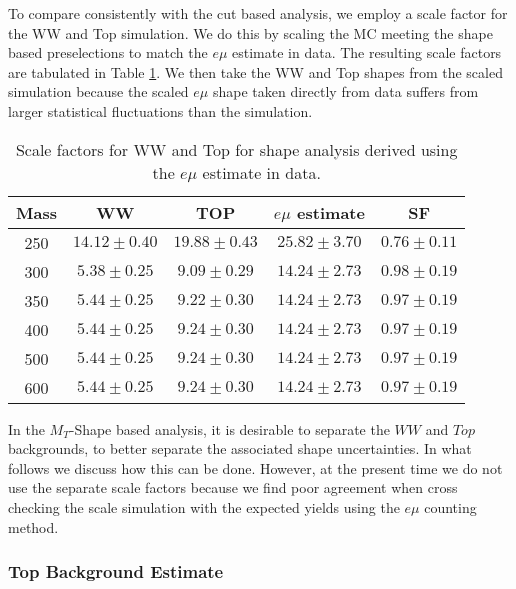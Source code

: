 
To compare consistently with the cut based analysis, we employ a scale factor
for the WW and Top simulation.  We do this by scaling the MC meeting the
shape based preselections to match the $e\mu$ estimate in data.
The resulting scale factors are tabulated in Table \ref{tab:shape_sf_emu}.
We then take the WW and Top shapes from the scaled simulation because the 
scaled $e\mu$ shape taken directly from data suffers from larger statistical
fluctuations than the simulation.

\begin{table}[!ht]
\begin{center}
\small{
\begin{tabular}{c|c|c|c|c}
Mass &   WW             & TOP              & $e\mu$ estimate   & SF \\ \hline
250  & $14.12 \pm 0.40$ & $19.88 \pm 0.43$ & $25.82 \pm 3.70$  & $0.76 \pm 0.11$ \\ \hline
300  & $5.38 \pm 0.25$  & $9.09 \pm 0.29$  & $14.24 \pm 2.73$  &  $0.98 \pm 0.19$ \\ \hline
350  & $5.44 \pm 0.25$  & $9.22 \pm 0.30$  & $14.24 \pm 2.73$  &  $0.97 \pm 0.19$ \\ \hline
400  & $5.44 \pm 0.25$  & $9.24 \pm 0.30$  & $14.24 \pm 2.73$  &  $0.97 \pm 0.19$ \\ \hline
500  & $5.44 \pm 0.25$  & $9.24 \pm 0.30$  & $14.24 \pm 2.73$  & $0.97 \pm 0.19$ \\ \hline
600  & $5.44 \pm 0.25$  & $9.24 \pm 0.30$  & $14.24 \pm 2.73$  & $0.97 \pm 0.19$ \\ \hline
\end{tabular}
\caption{Scale factors for WW and Top for shape analysis derived using the $e\mu$ estimate in data.}
\label{tab:shape_sf_emu}}
\end{center}
\end{table}


In the $M_T$-Shape based analysis, it is desirable to separate the $WW$ and $Top$ backgrounds,
to better separate the associated shape uncertainties.  In what follows we discuss how this can be done.
However, at the present time we do not use the separate scale factors because we find poor agreement
when cross checking the scale simulation with the expected yields using the $e\mu$ counting method.

\subsubsection{Top Background Estimate}

